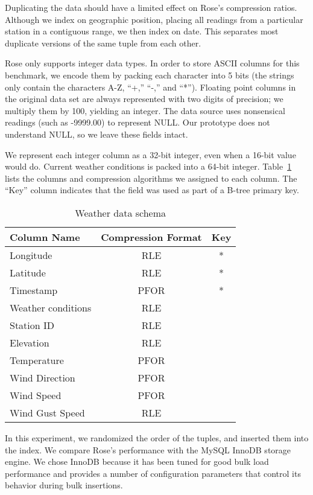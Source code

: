 \documentclass{vldb}
\newcommand{\rows}{Rose\xspace}
\newcommand{\rowss}{Rose's\xspace}
\begin{document}
Duplicating the data should have a limited effect on \rowss
compression ratios.  Although we index on geographic position, placing
all readings from a particular station in a contiguous range, we then
index on date.  This separates most duplicate versions of the same tuple
from each other.

\rows only supports integer data types.  In order to store ASCII columns for this benchmark, we encode them
by packing each character into 5 bits (the strings only
contain the characters A-Z, ``+,'' ``-,'' and ``*'').  Floating point columns in
the original data set are always represented with two digits of precision;
we multiply them by 100, yielding an integer.  The data source uses
nonsensical readings (such as -9999.00) to represent NULL.  Our
prototype does not understand NULL, so we leave these fields intact.

We represent each integer column as a 32-bit integer, even when a 16-bit value
would do.  Current weather conditions is packed into a
64-bit integer.  Table~\ref{tab:schema} lists the columns and
compression algorithms we assigned to each column.  The ``Key'' column indicates
that the field was used as part of a B-tree primary key.

\begin{table}
\caption{Weather data schema}
\centering
\label{tab:schema}
\begin{tabular}{|l|c|c|} \hline
Column Name     & Compression Format &  Key \\ \hline
Longitude       & RLE       & *       \\ \hline
Latitude        & RLE       & *       \\\hline
Timestamp       & PFOR       & *       \\\hline
Weather conditions& RLE       &        \\\hline
Station ID        & RLE       &        \\\hline
Elevation        & RLE       &        \\\hline
Temperature      & PFOR       &        \\\hline
Wind Direction        & PFOR       &        \\\hline
Wind Speed        & PFOR       &        \\\hline
Wind Gust Speed   & RLE       &        \\
\hline\end{tabular}
\end{table}
In this experiment, we randomized the order of the tuples, and
inserted them into the index.  We compare \rowss performance with the
MySQL InnoDB storage engine.  We chose InnoDB because it
has been tuned for good bulk load performance and provides a number
of configuration parameters that control its behavior during bulk
insertions.
\end{document}
